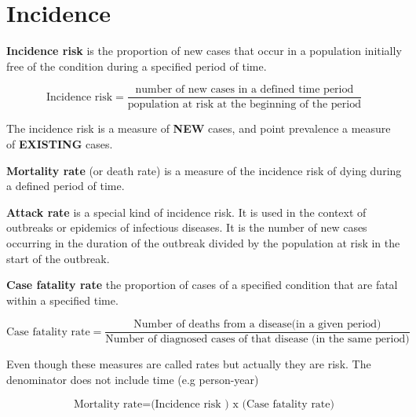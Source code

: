 \documentclass[
  letterpaper,
  DIV=11,
  numbers=noendperiod]{scrreprt}
\begin{document}
\hypertarget{incidence}{%
\section{Incidence}\label{incidence}}

\textbf{Incidence risk} is the proportion of new cases that occur in a
population initially free of the condition during a specified period of
time.

\[\text{Incidence risk}  = \frac{\text{number of new cases in a defined time period}}{\text{population at risk at the beginning of the period}}\]

\begin{tcolorbox}[enhanced jigsaw, bottomtitle=1mm, breakable, colframe=quarto-callout-important-color-frame, leftrule=.75mm, opacityback=0, opacitybacktitle=0.6, left=2mm, colbacktitle=quarto-callout-important-color!10!white, coltitle=black, rightrule=.15mm, toptitle=1mm, colback=white, titlerule=0mm, title=\textcolor{quarto-callout-important-color}{\faExclamation}\hspace{0.5em}{Important}, arc=.35mm, bottomrule=.15mm, toprule=.15mm]

The incidence risk is a measure of \textbf{NEW} cases, and point
prevalence a measure of \textbf{EXISTING} cases.

\end{tcolorbox}

\textbf{Mortality rate} (or death rate) is a measure of the incidence
risk of dying during a defined period of time.

\textbf{Attack rate} is a special kind of incidence risk. It is used in
the context of outbreaks or epidemics of infectious diseases. It is the
number of new cases occurring in the duration of the outbreak divided by
the population at risk in the start of the outbreak.

\textbf{Case fatality rate} the proportion of cases of a specified
condition that are fatal within a specified time.

\[\text{Case fatality rate} = \frac{\text{Number of deaths from a disease(in a given period)}}{\text{Number of diagnosed cases of that disease (in the same period)}}\]

\begin{tcolorbox}[enhanced jigsaw, bottomtitle=1mm, breakable, colframe=quarto-callout-important-color-frame, leftrule=.75mm, opacityback=0, opacitybacktitle=0.6, left=2mm, colbacktitle=quarto-callout-important-color!10!white, coltitle=black, rightrule=.15mm, toptitle=1mm, colback=white, titlerule=0mm, title=\textcolor{quarto-callout-important-color}{\faExclamation}\hspace{0.5em}{Important}, arc=.35mm, bottomrule=.15mm, toprule=.15mm]

Even though these measures are called rates but actually they are risk.
The denominator does not include time (e.g person-year)

\[\text{Mortality rate} = \text{(Incidence risk ) x (Case fatality rate)}\]

\end{tcolorbox}
\end{document}
